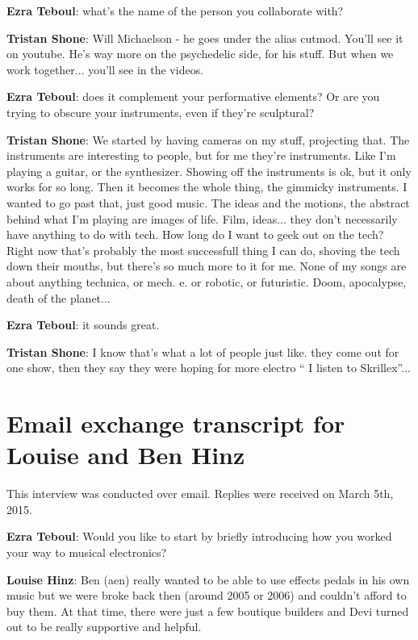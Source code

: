 \textbf{Ezra Teboul}: what's the name of the person you collaborate with? 

\textbf{Tristan Shone}: Will Michaelson - he goes under the alias cutmod. You'll see it on youtube. He's way more on the psychedelic side, for his stuff. But when we work together... you'll see in the videos. 

\textbf{Ezra Teboul}: does it complement your performative elements? Or are you trying to obscure your instruments, even if they're sculptural? 

\textbf{Tristan Shone}: We started by having cameras on my stuff, projecting that. The instruments are interesting to people, but for me they're instruments. Like I'm playing a guitar, or the synthesizer. Showing off the instruments is ok, but it only works for so long. Then it becomes the whole thing, the gimmicky instruments. I wanted to go past that, just good music. The ideas and the motions, the abstract behind what I'm playing are images of life. Film, ideas... they don't necessarily have anything to do with tech. How long do I want to geek out on the tech? Right now that's probably the most successfull thing I can do, shoving the tech down their mouths, but there's so much more to it for me. None of my songs are about anything technica, or mech. e. or robotic, or futuristic. Doom, apocalypse, death of the planet... 

\textbf{Ezra Teboul}: it sounds great. 

\textbf{Tristan Shone}: I know that's what a lot of people just like. they come out for one show, then they say they were hoping for more electro `` I listen to Skrillex''... 

\newpage

\clearpage 

\section{Email exchange transcript for Louise and Ben Hinz}

This interview was conducted over email. Replies were received on March 5th, 2015. 

\textbf{Ezra Teboul}: Would you like to start by briefly introducing how you worked your way to musical electronics?

\textbf{Louise Hinz}: Ben (aen) really wanted to be
able to use effects pedals in his own music but we were broke back
then (around 2005 or 2006) and couldn't afford to buy them. At that
time, there were just a few boutique builders and Devi turned out to
be really supportive and helpful.

